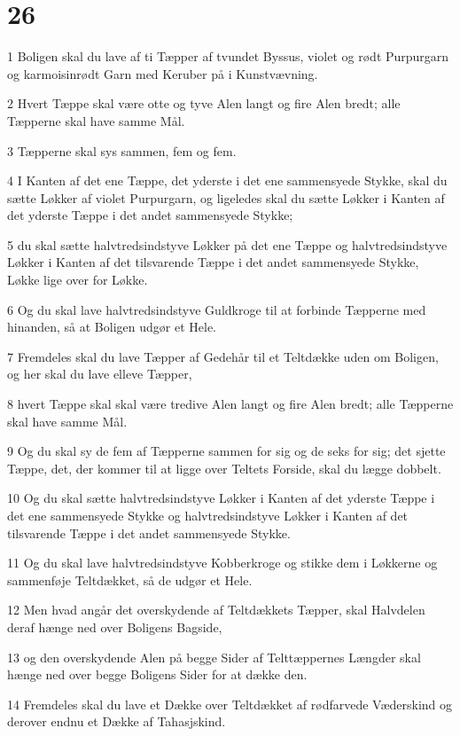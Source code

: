 \chapter{26}

\par 1 Boligen skal du lave af ti Tæpper af tvundet Byssus, violet og rødt Purpurgarn og karmoisinrødt Garn med Keruber på i Kunstvævning.
\par 2 Hvert Tæppe skal være otte og tyve Alen langt og fire Alen bredt; alle Tæpperne skal have samme Mål.
\par 3 Tæpperne skal sys sammen, fem og fem.
\par 4 I Kanten af det ene Tæppe, det yderste i det ene sammensyede Stykke, skal du sætte Løkker af violet Purpurgarn, og ligeledes skal du sætte Løkker i Kanten af det yderste Tæppe i det andet sammensyede Stykke;
\par 5 du skal sætte halvtredsindstyve Løkker på det ene Tæppe og halvtredsindstyve Løkker i Kanten af det tilsvarende Tæppe i det andet sammensyede Stykke, Løkke lige over for Løkke.
\par 6 Og du skal lave halvtredsindstyve Guldkroge til at forbinde Tæpperne med hinanden, så at Boligen udgør et Hele.
\par 7 Fremdeles skal du lave Tæpper af Gedehår til et Teltdække uden om Boligen, og her skal du lave elleve Tæpper,
\par 8 hvert Tæppe skal skal være tredive Alen langt og fire Alen bredt; alle Tæpperne skal have samme Mål.
\par 9 Og du skal sy de fem af Tæpperne sammen for sig og de seks for sig; det sjette Tæppe, det, der kommer til at ligge over Teltets Forside, skal du lægge dobbelt.
\par 10 Og du skal sætte halvtredsindstyve Løkker i Kanten af det yderste Tæppe i det ene sammensyede Stykke og halvtredsindstyve Løkker i Kanten af det tilsvarende Tæppe i det andet sammensyede Stykke.
\par 11 Og du skal lave halvtredsindstyve Kobberkroge og stikke dem i Løkkerne og sammenføje Teltdækket, så de udgør et Hele.
\par 12 Men hvad angår det overskydende af Teltdækkets Tæpper, skal Halvdelen deraf hænge ned over Boligens Bagside,
\par 13 og den overskydende Alen på begge Sider af Telttæppernes Længder skal hænge ned over begge Boligens Sider for at dække den.
\par 14 Fremdeles skal du lave et Dække over Teltdækket af rødfarvede Væderskind og derover endnu et Dække af Tahasjskind.
